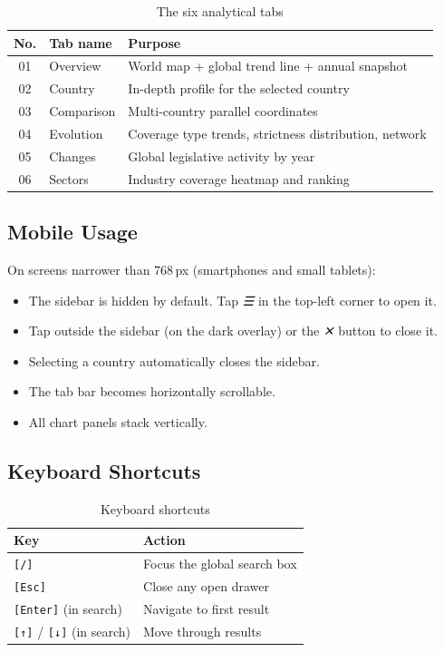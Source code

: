 \documentclass[12pt,a4paper]{article}
\newcommand{\keycap}[1]{%
  \texttt{\footnotesize[#1]}%
}
\newcommand{\uielem}[1]{\textit{#1}}
\begin{document}
\begin{table}[h]
\centering
\begin{tabularx}{\linewidth}{clX}
\toprule
\textbf{No.} & \textbf{Tab name} & \textbf{Purpose} \\
\midrule
01 & Overview & World map + global trend line + annual snapshot \\
02 & Country & In-depth profile for the selected country \\
03 & Comparison & Multi-country parallel coordinates \\
04 & Evolution & Coverage type trends, strictness distribution, network \\
05 & Changes & Global legislative activity by year \\
06 & Sectors & Industry coverage heatmap and ranking \\
\bottomrule
\end{tabularx}
\caption{The six analytical tabs}
\end{table}

\subsection{Mobile Usage}

On screens narrower than 768\,px (smartphones and small tablets):
\begin{itemize}
  \item The sidebar is hidden by default. Tap \uielem{☰} in the top-left corner to open it.
  \item Tap outside the sidebar (on the dark overlay) or the \uielem{✕} button to close it.
  \item Selecting a country automatically closes the sidebar.
  \item The tab bar becomes horizontally scrollable.
  \item All chart panels stack vertically.
\end{itemize}

\subsection{Keyboard Shortcuts}

\begin{table}[h]
\centering
\begin{tabular}{ll}
\toprule
\textbf{Key} & \textbf{Action} \\
\midrule
\keycap{/} & Focus the global search box \\
\keycap{Esc} & Close any open drawer \\
\keycap{Enter} (in search) & Navigate to first result \\
\keycap{↑}/\keycap{↓} (in search) & Move through results \\
\bottomrule
\end{tabular}
\caption{Keyboard shortcuts}
\end{table}
\end{document}
